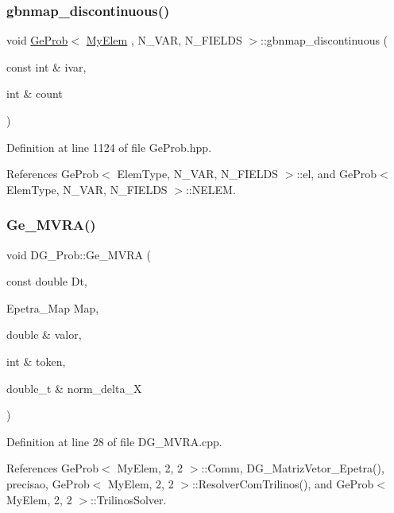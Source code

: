 \subsubsection{\texorpdfstring{gbnmap\+\_\+discontinuous()}{gbnmap\_discontinuous()}}
{\footnotesize\ttfamily void \hyperlink{classGeProb}{Ge\+Prob}$<$ \hyperlink{DG__Prob_8h_a83cd887ced9a6587428f267e50cd4787}{My\+Elem} , N\+\_\+\+V\+AR, N\+\_\+\+F\+I\+E\+L\+DS $>$\+::gbnmap\+\_\+discontinuous (\begin{DoxyParamCaption}\item[{const int \&}]{ivar,  }\item[{int \&}]{count }\end{DoxyParamCaption})\hspace{0.3cm}{\ttfamily [inherited]}}



Definition at line 1124 of file Ge\+Prob.\+hpp.



References Ge\+Prob$<$ Elem\+Type, N\+\_\+\+V\+A\+R, N\+\_\+\+F\+I\+E\+L\+D\+S $>$\+::el, and Ge\+Prob$<$ Elem\+Type, N\+\_\+\+V\+A\+R, N\+\_\+\+F\+I\+E\+L\+D\+S $>$\+::\+N\+E\+L\+EM.

\mbox{\label{classDG__Prob_af4fefe289d5d1beb69636817eb9f9703}} 
\subsubsection{\texorpdfstring{Ge\+\_\+\+M\+V\+R\+A()}{Ge\_MVRA()}}
{\footnotesize\ttfamily void D\+G\+\_\+\+Prob\+::\+Ge\+\_\+\+M\+V\+RA (\begin{DoxyParamCaption}\item[{const double}]{Dt,  }\item[{Epetra\+\_\+\+Map}]{Map,  }\item[{double \&}]{valor,  }\item[{int \&}]{token,  }\item[{double\+\_\+t \&}]{norm\+\_\+delta\+\_\+X }\end{DoxyParamCaption})}



Definition at line 28 of file D\+G\+\_\+\+M\+V\+R\+A.\+cpp.



References Ge\+Prob$<$ My\+Elem, 2, 2 $>$\+::\+Comm, D\+G\+\_\+\+Matriz\+Vetor\+\_\+\+Epetra(), precisao, Ge\+Prob$<$ My\+Elem, 2, 2 $>$\+::\+Resolver\+Com\+Trilinos(), and Ge\+Prob$<$ My\+Elem, 2, 2 $>$\+::\+Trilinos\+Solver.



